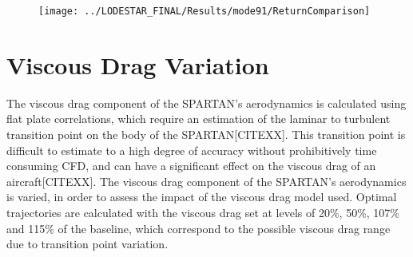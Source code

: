 \begin{figure}[th]
\centering
\texttt{[image: ../LODESTAR\_FINAL/Results/mode91/ReturnComparison]}
\caption{}
\label{fig:ReturnComparison15}
\end{figure}


\chapter{Viscous Drag Variation}


The viscous drag component of the SPARTAN's aerodynamics is calculated using flat plate correlations, which require an estimation of the laminar to turbulent transition point on the body of the SPARTAN[CITEXX]. This transition point is difficult to estimate to a high degree of accuracy without prohibitively time consuming CFD, and can have a significant effect on the viscous drag of an aircraft[CITEXX].
The viscous drag component of the SPARTAN's aerodynamics is varied, in order to assess the impact of the viscous drag model used. Optimal trajectories are calculated with the viscous drag set at levels of 20\%, 50\%, 107\% and 115\% of the baseline, which correspond to the possible viscous drag range due to transition point variation.

